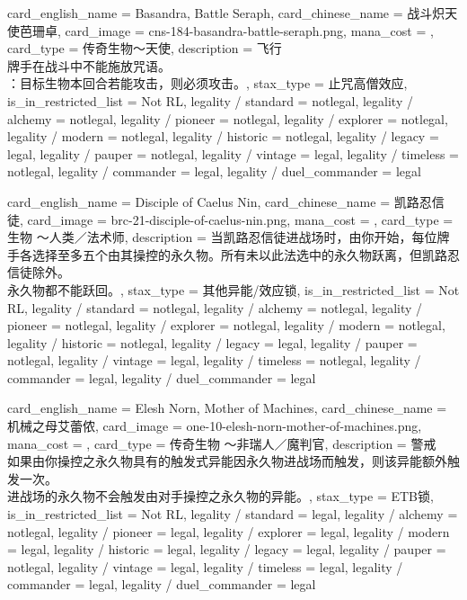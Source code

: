\documentclass[lang = cn, color = black, 10pt]{AllThatStax}
\begin{document}
\card
{
	card_english_name = {Basandra, Battle Seraph},
	card_chinese_name = {战斗炽天使芭珊卓},
	card_image = cns-184-basandra-battle-seraph.png,
	mana_cost = ,
	card_type = 传奇生物～天使,
	description = {飞行\\
		牌手在战斗中不能施放咒语。\\
		：目标生物本回合若能攻击，则必须攻击。},
	stax_type = 止咒高僧效应,
	is_in_restricted_list = Not RL,
	legality / standard = notlegal,
	legality / alchemy = notlegal,
	legality / pioneer = notlegal,
	legality / explorer = notlegal,
	legality / modern = notlegal,
	legality / historic = notlegal,
	legality / legacy = legal,
	legality / pauper = notlegal,
	legality / vintage = legal,
	legality / timeless = notlegal,
	legality / commander = legal,
	legality / duel_commander = legal
}

\card
{
	card_english_name = {Disciple of Caelus Nin},
	card_chinese_name = {凯路忍信徒},
	card_image = brc-21-disciple-of-caelus-nin.png,
	mana_cost = ,
	card_type = 生物 ～人类／法术师,
	description = {当凯路忍信徒进战场时，由你开始，每位牌手各选择至多五个由其操控的永久物。所有未以此法选中的永久物跃离，但凯路忍信徒除外。\\
		永久物都不能跃回。},
	stax_type = 其他异能/效应锁,
	is_in_restricted_list = Not RL,
	legality / standard = notlegal,
	legality / alchemy = notlegal,
	legality / pioneer = notlegal,
	legality / explorer = notlegal,
	legality / modern = notlegal,
	legality / historic = notlegal,
	legality / legacy = legal,
	legality / pauper = notlegal,
	legality / vintage = legal,
	legality / timeless = notlegal,
	legality / commander = legal,
	legality / duel_commander = legal
}

\card
{
	card_english_name = {Elesh Norn, Mother of Machines},
	card_chinese_name = {机械之母艾蕾侬},
	card_image = one-10-elesh-norn-mother-of-machines.png,
	mana_cost = ,
	card_type = 传奇生物 ～非瑞人／魔判官,
	description = {警戒\\
		如果由你操控之永久物具有的触发式异能因永久物进战场而触发，则该异能额外触发一次。\\
		进战场的永久物不会触发由对手操控之永久物的异能。},
	stax_type = ETB锁,
	is_in_restricted_list = Not RL,
	legality / standard = legal,
	legality / alchemy = notlegal,
	legality / pioneer = legal,
	legality / explorer = legal,
	legality / modern = legal,
	legality / historic = legal,
	legality / legacy = legal,
	legality / pauper = notlegal,
	legality / vintage = legal,
	legality / timeless = legal,
	legality / commander = legal,
	legality / duel_commander = legal
}
\end{document}
